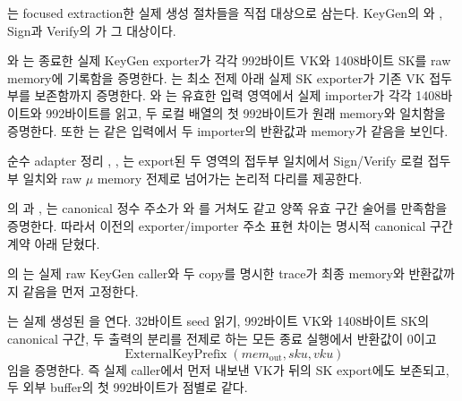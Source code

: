 는 focused
extraction한 실제 생성 절차들을 직접 대상으로 삼는다. KeyGen의
와
, Sign과 Verify의
가 그 대상이다.

\begin{verified}
\label{thm:api-copy-prefix}
와
는 종료한 실제 KeyGen exporter가
각각 992바이트 VK와 1408바이트 SK를 raw memory에 기록함을 증명한다.
는 최소
 전제 아래 실제 SK exporter가 기존 VK 접두부를
보존함까지 증명한다.
와
는 유효한 입력 영역에서 실제
importer가 각각 1408바이트와 992바이트를 읽고, 두 로컬 배열의 첫 992바이트가
원래 memory와 일치함을 증명한다. 또한
는 같은 입력에서 두 importer의
반환값과 memory가 같음을 보인다.
\end{verified}

순수 adapter 정리 ,
,
는 export된 두 영역의 접두부
일치에서 Sign/Verify 로컬 접두부 일치와 raw \(\mu\) memory 전제로 넘어가는
논리적 다리를 제공한다.

의
과
, 는
canonical 정수 주소가 와
를 거쳐도 같고 양쪽 유효 구간 술어를 만족함을
증명한다. 따라서 이전의 exporter/importer 주소 표현 차이는 명시적 canonical
구간 계약 아래 닫혔다.

의
는 실제 raw KeyGen caller와
두 copy를 명시한 trace가 최종 memory와 반환값까지 같음을 먼저 고정한다.

\begin{verified}
\label{thm:raw-keygen-export}
는 실제 생성된
을 연다. 32바이트 seed 읽기,
992바이트 VK와 1408바이트 SK의 canonical 구간, 두 출력의 분리를 전제로 하는
모든 종료 실행에서 반환값이 0이고
\[
  \operatorname{ExternalKeyPrefix}(mem_{\mathrm{out}},sku,vku)
\]
임을 증명한다. 즉 실제 caller에서 먼저 내보낸 VK가 뒤의 SK export에도
보존되고, 두 외부 buffer의 첫 992바이트가 점별로 같다.
\end{verified}

